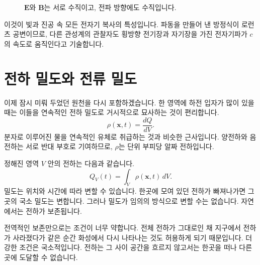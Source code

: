 \begin{figure}[H]
\centering
{}
\caption{\(\mathbf E\)와 \(\mathbf B\)는 서로 수직이고,
전파 방향에도 수직입니다.}
\end{figure}

이것이 빛과 진공 속 모든 전자기 복사의 특성입니다. 파동을 만들어 낸 방정식이 로런츠 공변이므로, 다른 관성계의 관찰자도 횡방향 전기장과 자기장을 가진 전자기파가 \(c\)의 속도로 움직인다고 기술합니다.

\section{전하 밀도와 전류 밀도}

이제 잠시 미뤄 두었던 원천을 다시 포함하겠습니다. 한 영역에 하전 입자가 많이 있을 때는 이들을 연속적인 전하 밀도로 거시적으로 묘사하는 것이 편리합니다.
\begin{equation}
\rho(\mathbf x,t)=\frac{dQ}{dV}.
\end{equation}
분자로 이루어진 물을 연속적인 유체로 취급하는 것과 비슷한 근사입니다. 양전하와 음전하는 서로 반대 부호로 기여하므로, \(\rho\)는 단위 부피당 알짜 전하입니다.

정해진 영역 \(V\) 안의 전하는 다음과 같습니다.
\begin{equation}
Q_V(t)=\int_V\rho(\mathbf x,t)\,dV.
\label{eq:charge-volume}
\end{equation}
밀도는 위치와 시간에 따라 변할 수 있습니다. 한곳에 모여 있던 전하가 빠져나가면 그곳의 국소 밀도는 변합니다. 그러나 밀도가 임의의 방식으로 변할 수는 없습니다. 자연에서는 전하가 보존됩니다.

전역적인 보존만으로는 조건이 너무 약합니다. 전체 전하가 그대로인 채 지구에서 전하가 사라졌다가 같은 순간 화성에서 다시 나타나는 것도 허용하게 되기 때문입니다. 더 강한 조건은 국소적입니다. 전하는 그 사이 공간을 흐르지 않고서는 한곳을 떠나 다른 곳에 도달할 수 없습니다.

